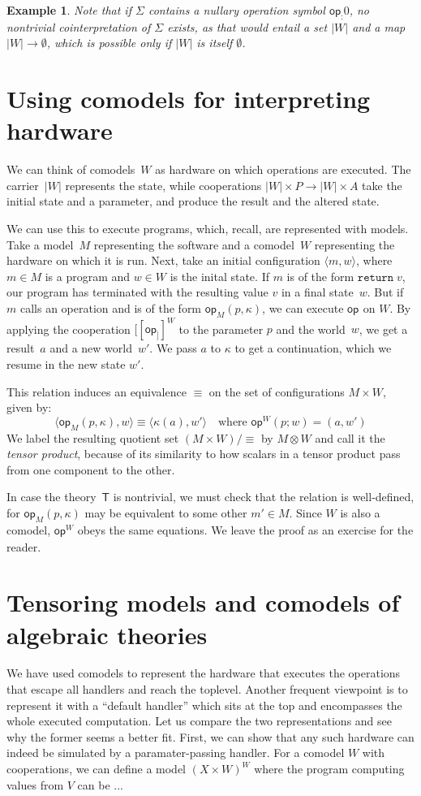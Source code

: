 \documentclass{amsart}
\newcommand{\theory}[1]{\mathsf{#1}} %
\newcommand{\op}[1]{\mathsf{op}_{#1}} %
\newcommand{\sem}[1]{[\![#1]\!]} %
\newcommand{\conf}[2]{\langle #1, #2 \rangle}
\newcommand{\kode}[1]{\mathtt{#1}}
\newcommand{\return}[1]{\kode{return}\;#1}
\newtheorem{example}[definition]{Example}
\begin{document}
\begin{example}
Note that if $\Sigma$ contains a nullary operation symbol $\op : 0$, no nontrivial cointerpretation of $\Sigma$ exists, as that would entail a set $|W|$ and a map $|W| \to \emptyset$, which is possible only if $|W|$ is itself $\emptyset$.
\end{example}

\section{Using comodels for interpreting hardware}

We can think of comodels~$W$ as hardware on which operations are executed. The carrier~$|W|$ represents the state, while cooperations $|W| \times P \to |W| \times A$ take the initial state and a parameter, and produce the result and the altered state.

We can use this to execute programs, which, recall, are represented with models. Take a model~$M$ representing the software and a comodel~$W$ representing the hardware  on which it is run. Next, take an initial configuration $\conf{m}{w}$, where $m \in M$ is a program and $w \in W$ is the inital state. If $m$ is of the form $\return v$, our program has terminated with the resulting value $v$ in a final state~$w$. But if $m$ calls an operation and is of the form $\op{M}(p, \kappa)$, we can execute $\op{}$ on $W$. By applying the cooperation $\sem{\op}^W$ to the parameter $p$ and the world~$w$, we get a result~$a$ and a new world~$w'$. We pass $a$ to $\kappa$ to get a continuation, which we resume in the new state $w'$.

This relation induces an equivalence $\equiv$ on the set of configurations $M \times W$, given by:
\[
  \conf{\op{M}(p, \kappa)}{w} \equiv \conf{\kappa(a)}{w'} \quad\text{where $\op{}^W(p; w) = (a, w')$}
\]
We label the resulting quotient set $(M \times W) / \equiv$ by $M \otimes W$ and call it the \emph{tensor product}, because of its similarity to how scalars in a tensor product pass from one component to the other.

In case the theory~$\theory{T}$ is nontrivial, we must check that the relation is well-defined, for $\op{M}(p, \kappa)$ may be equivalent to some other $m' \in M$. Since $W$ is also a comodel, $\op{}^W$ obeys the same equations. We leave the proof as an exercise for the reader.

\section{Tensoring models and comodels of algebraic theories}
\label{sec:tensoring-models}

We have used comodels to represent the hardware that executes the operations that escape all handlers and reach the toplevel. Another frequent viewpoint is to represent it with a ``default handler'' which sits at the top and encompasses the whole executed computation. Let us compare the two representations and see why the former seems a better fit. First, we can show that any such hardware can indeed be simulated by a paramater-passing handler. For a comodel $W$ with cooperations, we can define a model $(X \times W)^W$ where the program computing values from $V$ can be ...
\end{document}
